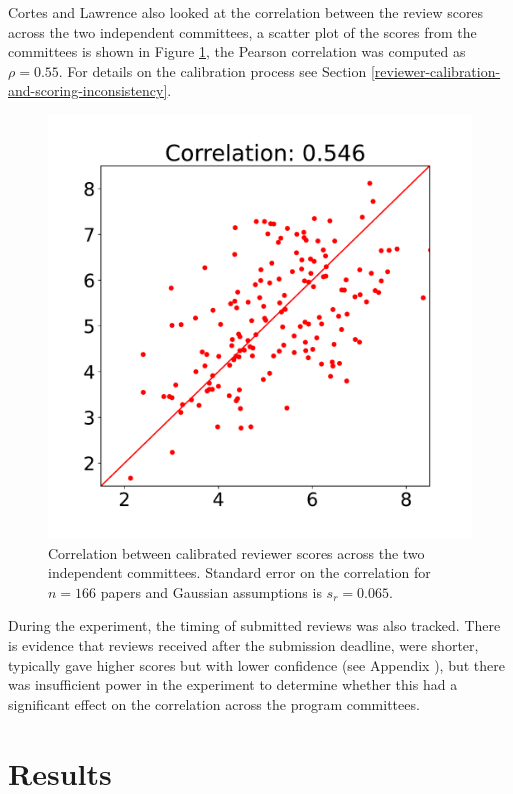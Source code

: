 \documentclass[twoside]{article}
\begin{document}
Cortes and Lawrence also looked at the correlation between the review scores across the two independent committees, a scatter plot of the scores from the committees is shown in Figure \ref{figure-calibrated-quality-correlation}, the Pearson correlation was computed as $\rho=0.55$. For details on the calibration process see Section \ref{reviewer-calibration-and-scoring-inconsistency}.

\begin{figure}[htb]
\includegraphics[width=0.9\columnwidth]{diagrams/neurips/calibrated-quality-correlation.pdf}

\caption{Correlation between calibrated reviewer scores across the two independent committees. Standard error on the correlation for $n=166$ papers and Gaussian assumptions is $s_r = 0.065$.}
\label{figure-calibrated-quality-correlation}
\end{figure}

During the experiment, the timing of submitted reviews was also tracked. There is evidence that reviews received after the submission deadline, were shorter, typically gave higher scores but with lower confidence (see Appendix \label{effect-of-late-reviews}), but there was insufficient power in the experiment to determine whether this had a significant effect on the correlation across the program committees. 

\section{Results}
\end{document}
